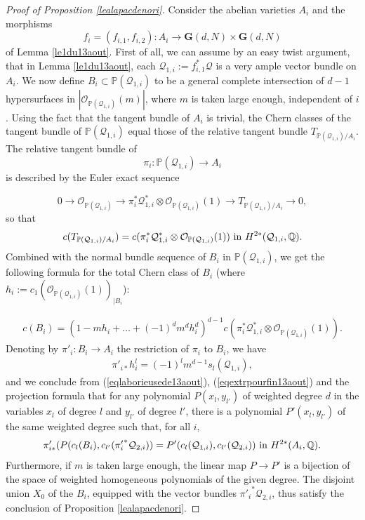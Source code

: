 \documentclass[10pt]{article}
\begin{document}
\begin{proof}[Proof of Proposition \ref{lealapacdenori}] Consider the abelian varieties $A_i$ and the morphisms
$$f_i=({f_{i,1},f_{i,2}}): A_i{\rightarrow} \mathbf{G}(d,N)\times \mathbf{G}(d,N)$$
of Lemma \ref{le1du13aout}. First of all,  we can assume by an easy twist argument, that in Lemma \ref{le1du13aout},  each $\mathcal{Q}_{1,i}:=f_{i,1}^*\mathcal{Q}$ is a very  ample vector  bundle on $A_i$. We now define
$B_i\subset \mathbb{P}(\mathcal{Q}_{1,i})$ to be a general complete intersection of $d-1$ hypersurfaces in
$|\mathcal{O}_{\mathbb{P}(\mathcal{Q}_{1,i})}(m)|$, where $m$ is taken large enough, independent of $i$. Using the fact that the tangent bundle of $A_i$ is trivial, the Chern classes of the tangent bundle of $\mathbb{P}(\mathcal{Q}_{1,i})$ equal those of  the relative tangent bundle $T_{\mathbb{P}(\mathcal{Q}_{1,i})/A_i}$. The relative tangent bundle of $$\pi_i: \mathbb{P}(\mathcal{Q}_{1,i})\rightarrow A_i$$
  is described by the Euler exact sequence

$$0\rightarrow \mathcal{O}_{\mathbb{P}(\mathcal{Q}_{1,i})}\rightarrow \pi_i^*\mathcal{Q}_{1,i}^*\otimes \mathcal{O}_{\mathbb{P}(\mathcal{Q}_{1,i})}(1)\rightarrow T_{\mathbb{P}(\mathcal{Q}_{1,i})/A_i}\rightarrow 0,$$
so that
$$c(T_{\mathbb{P}(\mathcal{Q}_{1,i})/A_i})=c(\pi_i^*\mathcal{Q}_{1,i}^*\otimes \mathcal{O}_{\mathbb{P}(\mathcal{Q}_{1,i})}(1))\,\,{\rm in}\,\,H^{2*}(\mathcal{Q}_{1,i},\mathbb{Q}).$$
Combined with the normal bundle sequence of $B_i$ in $\mathbb{P}(\mathcal{Q}_{1,i})$, we
get the following formula for the total Chern class of $B_i$ (where $h_i:=c_1(\mathcal{O}_{\mathbb{P}(\mathcal{Q}_{1,i})}(1))_{\mid B_i}$):

\begin{eqnarray}\label{eqlaborieusede13aout} c(B_i)= (1-mh_i+\ldots + (-1)^dm^{d}h_i^d)^{d-1}c(\pi_i^*\mathcal{Q}_{1,i}^*\otimes \mathcal{O}_{\mathbb{P}(\mathcal{Q}_{1,i})}(1)).\end{eqnarray}
Denoting by $\pi'_i:B_i\rightarrow A_i$ the restriction of $\pi_i$ to $B_i$, we have
\begin{eqnarray} \label{eqextrpourfin13aout} \pi'_{i*} h_i^l=(-1)^lm^{d-1} s_l(\mathcal{Q}_{1,i}),
\end{eqnarray} and we conclude from
(\ref{eqlaborieusede13aout}), (\ref{eqextrpourfin13aout}) and the projection formula that for  any polynomial $P(x_l,y_{l'})$  of weighted degree $d$ in the variables $x_l$ of degree $l$ and $y_{l'}$ of degree $l'$, there is a  polynomial $P'(x_l,y_{l'})$  of the same weighted degree such that, for all $i$,
$$\pi'_{i*}(P(c_l(B_i), c_{l'}({\pi'_i}^*\mathcal{Q}_{2,i}))=P'(c_{l}(\mathcal{Q}_{1,i}),c_{l'}(\mathcal{Q}_{2,i}))\,\,{\rm in}\,\,H^{2*}(A_i,\mathbb{Q}).$$
Furthermore, if $m$ is taken large enough, the linear map $P\rightarrow P'$ is  a bijection of the space of weighted homogeneous polynomials of the given degree. The disjoint union $X_0$ of the $B_i$, equipped with the vector bundles ${\pi'_i}^*\mathcal{Q}_{2,i}$, thus satisfy the conclusion of Proposition \ref{lealapacdenori}.
\end{proof}
\end{document}
